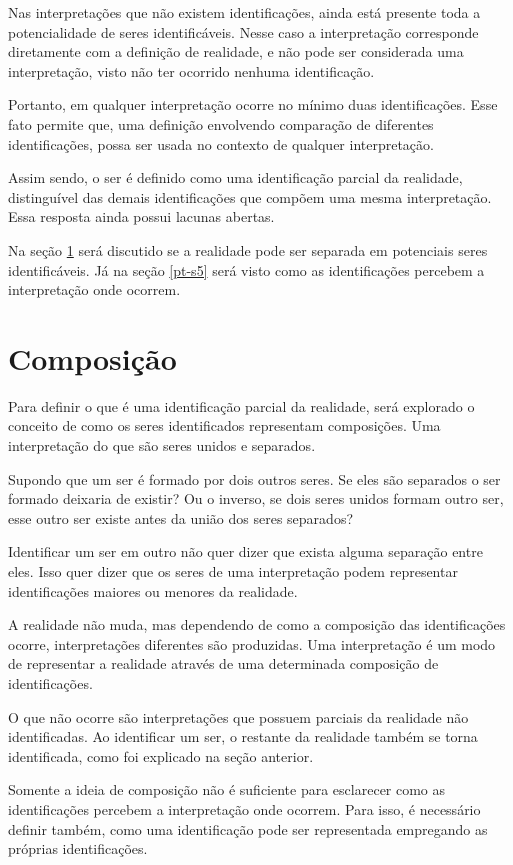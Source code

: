 \documentclass[11pt]{article}
\begin{document}
	Nas interpretações que não existem identificações, ainda está presente toda a potencialidade de seres identificáveis. Nesse caso a interpretação corresponde diretamente com a definição de realidade, e não pode ser considerada uma interpretação, visto não ter ocorrido nenhuma identificação.
	
	Portanto, em qualquer interpretação ocorre no mínimo duas identificações. Esse fato permite que, uma definição envolvendo comparação de diferentes identificações, possa ser usada no contexto de qualquer interpretação.
	
	Assim sendo, o ser é definido como uma identificação parcial da realidade, distinguível das demais identificações que compõem uma mesma interpretação. Essa resposta ainda possui lacunas abertas.
	
	Na seção \ref{pt-s4} será discutido se a realidade pode ser separada em potenciais seres identificáveis. Já na seção \ref{pt-s5} será visto como as identificações percebem a interpretação onde ocorrem.
	
	\section{Composição} \label{pt-s4}
	
	Para definir o que é uma identificação parcial da realidade, será explorado o conceito de como os seres identificados representam composições. Uma interpretação do que são seres unidos e separados.
	
	Supondo que um ser é formado por dois outros seres. Se eles são separados o ser formado deixaria de existir? Ou o inverso, se dois seres unidos formam outro ser, esse outro ser existe antes da união dos seres separados?

	Identificar um ser em outro não quer dizer que exista alguma separação entre eles. Isso quer dizer que os seres de uma interpretação podem representar identificações maiores ou menores da realidade.
	
	A realidade não muda, mas dependendo de como a composição das identificações ocorre, interpretações diferentes são produzidas. Uma interpretação é um modo de representar a realidade através de uma determinada composição de identificações.
	
	O que não ocorre são interpretações que possuem parciais da realidade não identificadas. Ao identificar um ser, o restante da realidade também se torna identificada, como foi explicado na seção anterior.
	
	Somente a ideia de composição não é suficiente para esclarecer como as identificações percebem a interpretação onde ocorrem. Para isso, é necessário definir também, como uma identificação pode ser representada empregando as próprias identificações.
\end{document}
